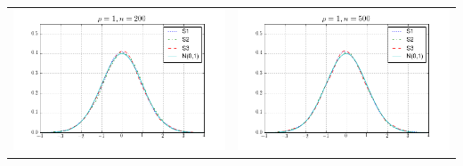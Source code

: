 \begin{table}[!ht]
{\begin{tabular}{c c}
\includegraphics[width=8cm]{beta2_t_ratio_200_1} & \includegraphics[width=8cm]{beta2_t_ratio_500_1} \\
\end{tabular}
}
\end{table}

\begin{table}[!ht]
\selectfont \caption{Estimate and 95\% Confidence Interval of $\hat{\al}_n$}
\label{alpha_plot} 
\end{table}

